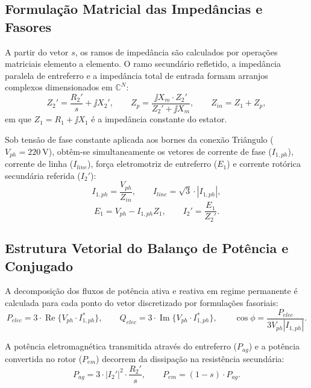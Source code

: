\subsection{Formulação Matricial das Impedâncias e Fasores}\label{subsec:thevenin_analitico}

A partir do vetor $s$, os ramos de impedância são calculados por operações matriciais elemento a elemento. O ramo secundário refletido, a impedância paralela de entreferro e a impedância total de entrada formam arranjos complexos dimensionados em $\mathbb{C}^N$:
\begin{equation}
Z_2' = \frac{R_2'}{s} + \jj X_2', \qquad Z_p = \frac{\jj X_m \cdot Z_2'}{Z_2' + \jj X_m}, \qquad Z_{in} = Z_1 + Z_p,
\label{eq:impedancias_vetoriais}
\end{equation}
em que $Z_1 = R_1 + \jj X_1$ é a impedância constante do estator.

Sob tensão de fase constante aplicada aos bornes da conexão Triângulo ($V_{ph} = \SI{220}{\volt}$), obtêm-se simultaneamente os vetores de corrente de fase ($I_{1,ph}$), corrente de linha ($I_{line}$), força eletromotriz de entreferro ($E_1$) e corrente rotórica secundária referida ($I_2'$):
\begin{equation}
I_{1,ph} = \frac{V_{ph}}{Z_{in}}, \qquad I_{line} = \sqrt{3} \cdot |I_{1,ph}|,
\label{eq:correntes_estatoricas_vetor}
\end{equation}
\begin{equation}
E_1 = V_{ph} - I_{1,ph} Z_1, \qquad I_2' = \frac{E_1}{Z_2'}.
\label{eq:corrente_rotorica_vetor}
\end{equation}

\subsection{Estrutura Vetorial do Balanço de Potência e Conjugado}\label{subsec:balanco_vetorial}

A decomposição dos fluxos de potência ativa e reativa em regime permanente é calculada para cada ponto do vetor discretizado por formulações fasoriais:
\begin{equation}
P_{elec} = 3 \cdot \operatorname{Re}\{V_{ph} \cdot I_{1,ph}^*\}, \qquad Q_{elec} = 3 \cdot \operatorname{Im}\{V_{ph} \cdot I_{1,ph}^*\}, \qquad \cos\phi = \frac{P_{elec}}{3 V_{ph} |I_{1,ph}|}.
\label{eq:potencias_entrada_vetoriais}
\end{equation}

A potência eletromagnética transmitida através do entreferro ($P_{ag}$) e a potência convertida no rotor ($P_{em}$) decorrem da dissipação na resistência secundária:
\begin{equation}
P_{ag} = 3 \cdot |I_2'|^2 \cdot \frac{R_2'}{s}, \qquad P_{em} = (1 - s) \cdot P_{ag}.
\label{eq:potencias_conversao_vetoriais}
\end{equation}

